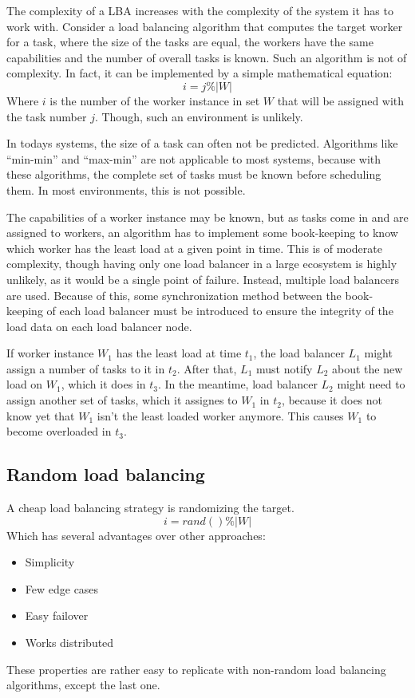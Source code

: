 The complexity of a \ac{LBA} increases with the complexity of the system it has
to work with.
Consider a load balancing algorithm that computes the target worker for a task,
where the size of the tasks are equal, the workers have the same capabilities
and the number of overall tasks is known.
Such an algorithm is not of complexity.
In fact, it can be implemented by a simple mathematical equation:
\begin{equation}
    i = j \% |W|
\end{equation}
Where $i$ is the number of the worker instance in set $W$ that will be assigned
with the task number $j$.
Though, such an environment is unlikely.

In todays systems, the size of a task can often not be predicted.
Algorithms like ``min-min'' and ``max-min''
\cite{anInDepthAnal} are not applicable to most systems, because
with these algorithms, the complete set of tasks must be known before scheduling
them.
In most environments, this is not possible.

The capabilities of a worker instance may be known, but as tasks come in and are
assigned to workers, an algorithm has to implement some book-keeping to know
which worker has the least load at a given point in time.
This is of moderate complexity, though having only one load balancer in a large
ecosystem is highly unlikely, as it would be a single point of failure.
Instead, multiple load balancers are used.
Because of this, some synchronization method between the book-keeping of each
load balancer must be introduced to ensure the integrity of the load data on
each load balancer node.

If worker instance $W_1$ has the least load at time $t_1$, the load balancer
$L_1$ might assign a number of tasks to it in $t_2$.
After that, $L_1$ must notify $L_2$ about the new load on $W_1$, which it does
in $t_3$.
In the meantime, load balancer $L_2$ might need to assign another set of tasks,
which it assignes to $W_1$ in $t_2$, because it does not know yet that $W_1$
isn't the least loaded worker anymore.
This causes $W_1$ to become overloaded in $t_3$.


\subsection{Random load balancing}

A cheap load balancing strategy is randomizing the target.
\begin{equation}
    i = rand() \% |W|
\end{equation}
Which has several advantages over other approaches:
\begin{itemize}
    \item Simplicity
    \item Few edge cases
    \item Easy failover
    \item Works distributed
\end{itemize} %
These properties are rather easy to replicate with non-random load balancing
algorithms, except the last one.

